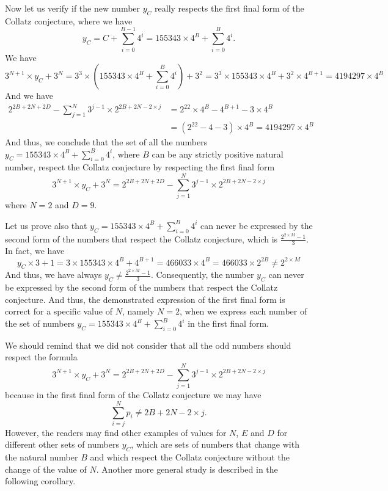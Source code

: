 \documentclass[11pt,a4paper]{article}
\theoremstyle{definition}
\begin{document}
Now let us verify if the new number $y_C$ really respects the first final form of the
Collatz conjecture, where we have
\begin{equation}
y_C=C+\sum_{i=0}^{B-1}4^{i}=155343\times 4^{B}+\sum_{i=0}^{B}4^{i}.
\end{equation}
We have
\begin{equation}
3^{N+1}\times y_C+3^{N}=3^{3}\times\left(155343\times 4^{B}+\sum_{i=0}^{B}4^{i}\right)+3^{2}
=3^{3}\times 155343\times 4^{B}+3^{2}\times 4^{B+1}=4194297\times 4^{B}
\end{equation}
And we have
\begin{equation}
\begin{split}
2^{2B+2N+2D}-\sum_{j=1}^{N}3^{j-1}\times 2^{2B+2N-2\times j}
&=2^{22}\times 4^{B}-4^{B+1}-3\times 4^{B}\\
&=\left(2^{22}-4-3\right)\times 4^{B}=4194297\times 4^{B}
\end{split}
\end{equation}
And thus, we conclude that the set of all the numbers
$y_C=155343\times 4^{B}+\sum_{i=0}^{B}4^{i}$, where $B$ can be any strictly positive natural
number, respect the Collatz conjecture by respecting the first final form
\[3^{N+1}\times y_C+3^{N}=2^{2B+2N+2D}-\sum_{j=1}^{N}3^{j-1}\times 2^{2B+2N-2\times j}\]
where $N=2$ and $D=9$.

Let us prove also that $y_C=155343\times 4^{B}+\sum_{i=0}^{B}4^{i}$ can never be expressed by
the second form of the numbers that respect the Collatz conjecture, which is
$\frac{2^{2\times M}-1}{3}$. In fact, we have
\begin{equation}
y_C\times 3+1=3\times 155343\times 4^{B}+4^{B+1}=466033\times 4^{B}=466033\times 2^{2B}\ne 2^{2\times M}
\end{equation}
And thus, we have always $y_C\ne\frac{2^{2\times M}-1}{3}$. Consequently, the number $y_C$
can never be expressed by the second form of the numbers that respect the Collatz
conjecture. And thus, the demonstrated expression of the first final form is correct for a
specific value of $N$, namely $N=2$, when we express each number of the set of numbers
$y_C=155343\times 4^{B}+\sum_{i=0}^{B}4^{i}$ in the first final form.

We should remind that we did not consider that all the odd numbers should respect the
formula
\[3^{N+1}\times y_C+3^{N}=2^{2B+2N+2D}-\sum_{j=1}^{N}3^{j-1}\times 2^{2B+2N-2\times j}\]
because in the first final form of the Collatz conjecture we may have
\begin{equation}
\sum_{i=j}^{N}p_i\neq 2B+2N-2\times j.
\end{equation}
However, the readers may find other examples of values for $N$, $E$ and $D$ for different
other sets of numbers $y_C$, which are sets of numbers that change with the natural number
$B$ and which respect the Collatz conjecture without the change of the value of $N$.
Another more general study is described in the following corollary.
\end{document}
